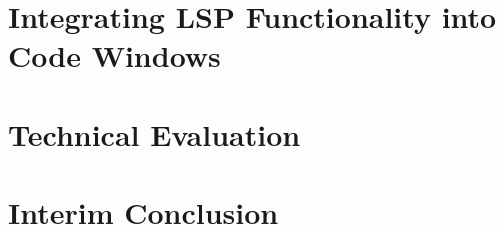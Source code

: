 \documentclass[../thesis]{subfiles}
\begin{document}
\section{Integrating LSP Functionality into Code Windows}\label{sec:intowindow}
\fxfatal{}

\section{Technical Evaluation}\label{sec:techeval}

\fxfatal{}


\section{Interim Conclusion}\label{sec:implconclusion}
\fxfatal{}


\end{document}
